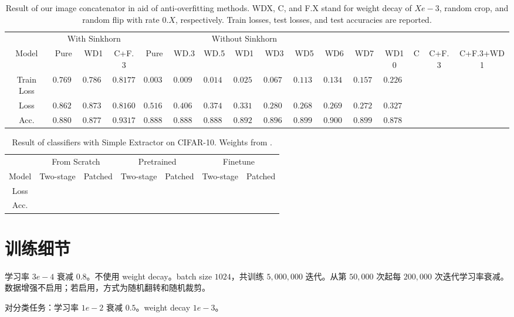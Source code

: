 \documentclass[a4paper]{article}
\begin{document}
\begin{table}[H]
    \centering
    \begin{tabular}{cccccccccccccccc}
        \hline
        &\multicolumn{3}{c}{With Sinkhorn}&\multicolumn{7}{c}{Without Sinkhorn}\\
        Model           &Pure&WD1&C+F.3&            Pure&WD.3&WD.5&WD1&WD3&WD5&WD6&WD7&WD10&C&C+F.3&C+F.3+WD1\\
        \hline
        Train Loss      &$0.7691$&$0.7865$&$0.8177 $&     $0.0038 $&$0.0097 $&$0.0140 $&$0.0254 $&$0.0675 $&$0.1133 $&$0.1348$&$0.1574$&$0.2268 $\\
        Loss            &$0.8628$&$0.8731$&$0.8160 $&     $0.5168 $&$0.4064 $&$0.3741 $&$0.3314 $&$0.2809 $&$0.2689 $&$0.2691$&$0.2721$&$0.3273 $\\
        Acc.            &$0.8802$&$0.8773$&$0.9317 $&     $0.8880 $&$0.8883 $&$0.8884 $&$0.8921 $&$0.8965 $&$0.8996 $&$0.9002$&$0.8994$&$0.8785 $\\
        \hline
    \end{tabular}
    \caption{Result of our image concatenator in aid of anti-overfitting methods. WDX, C, and F.X stand for weight decay of $Xe-3$, random crop, and random flip with rate $0.X$, respectively. Train losses, test losses, and test accuracies are reported.}
    \label{tab:1}
\end{table}

\begin{table}[H]
    \centering
    \begin{tabular}{ccccccc}
        \hline
        &\multicolumn{2}{c}{From Scratch}&\multicolumn{2}{c}{Pretrained}&\multicolumn{2}{c}{Finetune}\\
        Model&Two-stage&Patched&Two-stage&Patched&Two-stage&Patched\\
        \hline
        Loss\\
        Acc.\\
        \hline

    \end{tabular}
    \caption{Result of classifiers with Simple Extractor on CIFAR-10. Weights from .}
    \label{tab:2}
\end{table}


\section{训练细节}

学习率 $3e-4$ 衰减 $0.8$。不使用 weight decay。batch size $1024$，共训练 $5,000,000$ 迭代。从第 $50,000$ 次起每 $200,000$ 次迭代学习率衰减。数据增强不启用；若启用，方式为随机翻转和随机裁剪。

对分类任务：学习率 $1e-2$ 衰减 $0.5$。weight decay $1e-3$。
\end{document}
